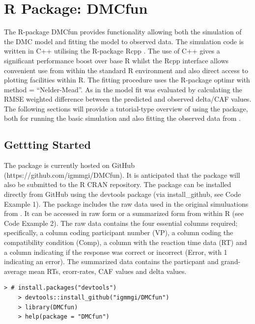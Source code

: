 \section{R Package: DMCfun} 
The R-package DMCfun provides functionality allowing both the simulation of the
DMC model and fitting the model to observed data. The simulation code is
written in C++ utilising the R-package Rcpp \parencite{eddelbuettel2011rcpp}.
The use of C++ gives a significant performance boost over base R whilst the
Rcpp interface allows convenient use from within the standard R environment
and also direct access to plotting facilities within R. The fitting procedure
uses the R-package optimr \textcite{optimr} with method = ``Nelder-Mead''. As in
\textcite{ulrich2015automatic} the model fit was evaluated by calculating the
RMSE weighted difference between the predicted and observed delta/CAF values.
The following sections will provide a tutorial-type overview of using the
package, both for running the basic simulation and also fitting the observed
data from \textcite{ulrich2015automatic}.

\label{dmc_fun}
\subsection{Gettting Started}
\label{getting_started}
The package is currently hosted on GitHub (https://github.com/igmmgi/DMCfun).
It is anticipated that the package will also be submitted to the R CRAN
repository. The package can be installed directly from GitHub using the
devtools package (via install\_github, see Code Example 1). The package
includes the raw data used in the original simuluations from
\textcite{ulrich2015automatic}. It can be accessed in raw form or a summarized
form from within R (see Code Example 2). The raw data contains the four essential
columns required; specifically, a column coding participant number (VP), a
column coding the compatibility condition (Comp), a column with the reaction
time data (RT) and a column indicating if the response was correct or incorrect
(Error, with 1 indicating an error). The summarized data contains the particpant 
and grand-average mean RTs, erorr-rates, CAF values and delta values. 

\begin{minipage}{\linewidth}
    \begin{lstlisting}[style = R, title={R Code Example 1: Instalation}, captionpos=t]
    > # install.packages("devtools")
    > devtools::install_github("igmmgi/DMCfun")
    > library(DMCfun)
    > help(package = "DMCfun")  \end{lstlisting}
\end{minipage}


